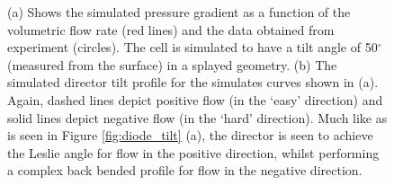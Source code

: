 \begin{figure}
\begin{center}
\end{center}
\caption[Comparison of experimental and simulated pressure gradients as a function of flow rate and direction]{\label{fig:simulation_data}(a) Shows the simulated pressure gradient as a function of the volumetric flow rate (red lines) and the data obtained from experiment (circles). The cell is simulated to have a tilt angle of 50$^{\circ}$ (measured from the surface) in a splayed geometry. (b) The simulated director tilt profile for the simulates curves shown in (a). Again, dashed lines depict positive flow (in the `easy' direction) and solid lines depict negative flow (in the `hard' direction). Much like as is seen in Figure \ref{fig:diode_tilt} (a), the director is seen to achieve the Leslie angle for flow in the positive direction, whilst performing a complex back bended profile for flow in the negative direction.}
\end{figure}

